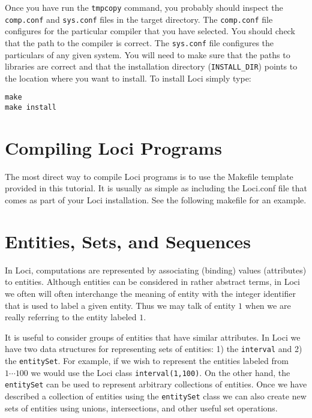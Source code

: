\documentclass[10pt,epsf]{book}
\begin{document}
Once you have run the {\tt tmpcopy} command, you probably should
inspect the {\tt comp.conf} and {\tt sys.conf} files in the target directory.
The {\tt comp.conf} file configures for the particular compiler that you
have selected.  You should check that the path to the compiler is
correct.  The {\tt sys.conf} file configures the particulars of any
given system.  You will need to make sure that the paths to libraries
are correct and that the installation directory ({\tt INSTALL\_DIR})
points to the location where you want to install.  To install Loci
simply type:

\begin{verbatim}
make
make install
\end{verbatim}


\section{ Compiling Loci Programs }

The most direct way to compile Loci programs is to use the Makefile
template provided in this tutorial.  It is usually as simple as
including the Loci.conf file that comes as part of your Loci
installation.  See the following makefile for an example.





\section{Entities, Sets, and Sequences}

In Loci, computations are represented by associating (binding) values
(attributes) to entities.  Although entities can be considered in
rather abstract terms, in Loci we often will often interchange the
meaning of entity with the integer identifier that is used to label a
given entity.  Thus we may talk of entity $1$ when we are really
referring to the entity labeled $1$.  

It is useful to consider groups of entities that have similar
attributes.  In Loci we have two data structures for representing sets
of entities:  1) the {\tt interval} and 2) the {\tt entitySet}.  For
example, if we wish to represent the entities labeled from $1 \cdots
100$ we would use the Loci class {\tt interval(1,100)}.  On the other
hand, the {\tt entitySet} can be used to represent arbitrary
collections of entities.  Once we have described a collection of
entities using the {\tt entitySet} class we can also create new sets
of entities using unions, intersections, and other useful set
operations.  
\end{document}
